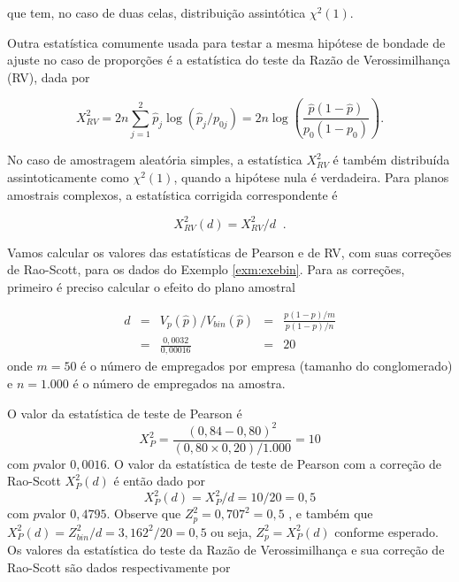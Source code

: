 \documentclass[]{book}
\theoremstyle{definition}
\theoremstyle{definition}
\theoremstyle{definition}
\theoremstyle{remark}
\begin{document}
que tem, no caso de duas celas, distribuição assintótica
\(\chi^{2}\left( 1\right)\).

Outra estatística comumente usada para testar a mesma hipótese de
bondade de ajuste no caso de proporções é a estatística do teste da
Razão de Verossimilhança (RV), dada por

\begin{equation}
X_{RV}^{2}=2n\sum\limits_{j=1}^{2}\widehat{p}_{j}\log \left( 
\widehat{p}_{j}/p_{0j}\right) =2n\log \left( \frac{\widehat{p}\left( 1-
\widehat{p}\right) }{p_{0}\left( 1-p_{0}\right) }\right) .
\label{eq:qual4}
\end{equation}

No caso de amostragem aleatória simples, a estatística \(X_{RV}^{2}\) é
também distribuída assintoticamente como \(\chi ^{2}\left(1\right)\),
quando a hipótese nula é verdadeira. Para planos amostrais complexos, a
estatística corrigida correspondente é

\begin{equation}
X_{RV}^{2}(d)=X_{RV}^{2}/d\;\;.  
\label{eq:qual5}
\end{equation}

Vamos calcular os valores das estatísticas de Pearson e de RV, com suas
correções de Rao-Scott, para os dados do Exemplo \ref{exm:exebin}. Para
as correções, primeiro é preciso calcular o efeito do plano amostral

\[
\begin{array}{llcll}
d & = & V_{p}\left( \widehat{p}\right) /V_{bin}\left( \widehat{p}\right) & =
& \frac{p\left( 1-p\right) /m}{p\left( 1-p\right) /n} \\ 
& = & \frac{0,0032}{0,00016} & = & 20
\end{array}
\] onde \(m=50\) é o número de empregados por empresa (tamanho do
conglomerado) e \(n=1.000\) é o número de empregados na amostra.

O valor da estatística de teste de Pearson é \[
X_{P}^{2}=\frac{\left( 0,84-0,80\right) ^{2}}{\left( 0,80\times 0,20\right)
/1.000}=10 
\] com \(p\)valor \(0,0016\). O valor da estatística de teste de Pearson
com a correção de Rao-Scott \(X_{P}^{2}(d)\) é então dado por \[
X_{P}^{2}(d)=X_{P}^{2}/d=10/20=0,5 
\] com \(p\)valor \(0,4795\). Observe que \(Z_{p}^{2}=0,707^{2}=0,5\) ,
e também que \(X_{P}^{2}(d)=Z_{bin}^{2}/d= 3,162^{2}/20=0,5\) ou seja,
\(Z_{p}^{2}=X_{P}^{2}(d)\) conforme esperado. Os valores da estatística
do teste da Razão de Verossimilhança e sua correção de Rao-Scott são
dados respectivamente por
\end{document}
